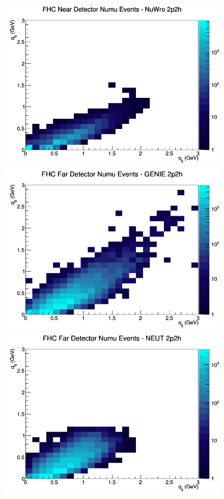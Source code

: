 \begin{figure}[h]
\includegraphics[width=\linewidth]{eff_q0_q3/FGT/2p2h_FHC_ND_numu_q3_q0_NuWro.png}
\endminipage
\newline
{}
\includegraphics[width=\linewidth]{eff_q0_q3/FGT/2p2h_FHC_FD_numu_q3_q0_GENIE.png}
\endminipage
{}
\includegraphics[width=\linewidth]{eff_q0_q3/FGT/2p2h_FHC_FD_numu_q3_q0_NEUT.png}

\end{figure}

